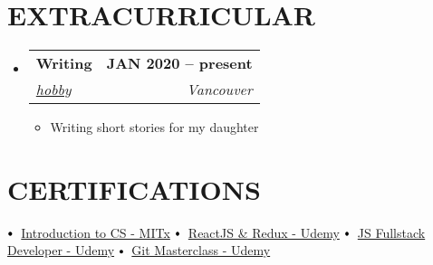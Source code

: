 \documentclass[letterpaper,11pt]{article}
\makeatletter
\newcommand{\resumeItem}[1]{
  \item\small{
    {#1 \vspace{-2pt}}
  }
}
\newcommand{\resumeSubheading}[4]{
  \vspace{-2pt}\item
    \begin{tabular*}{1.0\textwidth}[t]{l@{\extracolsep{\fill}}r}
      \textbf{\large#1} & \textbf{\small #2} \\
      \textit{\large#3} & \textit{\small #4} \\
      
    \end{tabular*}\vspace{-7pt}
}
\newcommand{\resumeSubHeadingListStart}{\begin{itemize}[leftmargin=0.0in, label={}]}
\newcommand{\resumeSubHeadingListEnd}{\end{itemize}}
\newcommand{\resumeItemListStart}{\begin{itemize}}
\newcommand{\resumeItemListEnd}{\end{itemize}\vspace{-5pt}}
\newcommand\sbullet[1][.5]{\mathbin{\vcenter{\hbox{\scalebox{#1}{$\bullet$}}}}}
\makeatother
\begin{document}
\section{EXTRACURRICULAR}
    \resumeSubHeadingListStart
        \resumeSubheading{Writing }{JAN 2020 -- present}{\underline{hobby}}{Vancouver}
            \resumeItemListStart
                \resumeItem{\normalsize{Writing short stories for my daughter \textbf{}}}
                
            \resumeItemListEnd
    \resumeSubHeadingListEnd
          \vspace{0pt}
 
\section{CERTIFICATIONS}

$\sbullet[.75] \hspace{0.1cm}$ {\href{certificateLink.com}{Introduction to CS - MITx}} \hspace{1.6cm}
$\sbullet[.75] \hspace{0.1cm}$ {\href{certificateLink.com}{ReactJS \& Redux - Udemy}} \hspace{1.6cm}
$\sbullet[.75] \hspace{0.1cm}$ {\href{certificateLink.com}{JS Fullstack Developer - Udemy}} \hspace{1.6cm}
$\sbullet[.75] \hspace{0.2cm}${\href{certificateLink.com} {Git Masterclass - Udemy}} \hspace{1.6cm}
\end{document}
